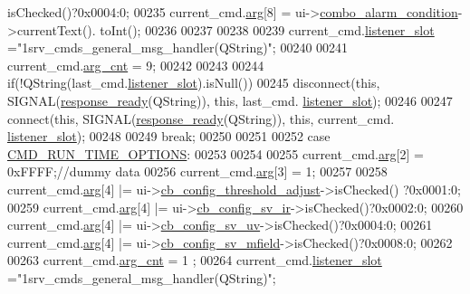 \begin{DoxyCode}
      isChecked()?0x0004:0;
00235             current\_cmd.\hyperlink{a00001_a56e6c2d7315d0ae60a51e8b140c9cfe4}{arg}[8]      = ui->\hyperlink{a00027_a2af463e4a88fddd219f2e41a386fbd68}{combo\_alarm\_condition}->currentText().
      toInt();
00236 
00237 
00238 
00239             current\_cmd.\hyperlink{a00001_abb76d8edb39876deb60975c8fd784b3f}{listener\_slot}   =\textcolor{stringliteral}{"1srv\_cmds\_general\_msg\_handler(QString)"};
00240 
00241             current\_cmd.\hyperlink{a00001_affcea772a1bc5362ebbc274b6166f81b}{arg\_cnt}     = 9;
00242 
00243 
00244             \textcolor{keywordflow}{if}(!QString(last\_cmd.\hyperlink{a00001_abb76d8edb39876deb60975c8fd784b3f}{listener\_slot}).isNull())
00245             disconnect(\textcolor{keyword}{this}, SIGNAL(\hyperlink{a00006_a3f6396874778799cf07a7a0149e54977}{response\_ready}(QString)), \textcolor{keyword}{this}, last\_cmd.
      \hyperlink{a00001_abb76d8edb39876deb60975c8fd784b3f}{listener\_slot});
00246 
00247             connect(\textcolor{keyword}{this}, SIGNAL(\hyperlink{a00006_a3f6396874778799cf07a7a0149e54977}{response\_ready}(QString)), \textcolor{keyword}{this}, current\_cmd.
      \hyperlink{a00001_abb76d8edb39876deb60975c8fd784b3f}{listener\_slot});
00248 
00249         \textcolor{keywordflow}{break};
00250 
00251 
00252     \textcolor{keywordflow}{case} \hyperlink{a00031_a1d8673a7ca545f3e382fc538f543ab72}{CMD\_RUN\_TIME\_OPTIONS}:
00253 
00254 
00255             current\_cmd.\hyperlink{a00001_a56e6c2d7315d0ae60a51e8b140c9cfe4}{arg}[2]   = 0xFFFF;\textcolor{comment}{//dummy data}
00256             current\_cmd.\hyperlink{a00001_a56e6c2d7315d0ae60a51e8b140c9cfe4}{arg}[3]   = 1;
00257 
00258             current\_cmd.\hyperlink{a00001_a56e6c2d7315d0ae60a51e8b140c9cfe4}{arg}[4]  |= ui->\hyperlink{a00027_a433ffc427e1103e6c2939f949ee5e5b5}{cb\_config\_threshold\_adjust}->isChecked()
      ?0x0001:0;
00259             current\_cmd.\hyperlink{a00001_a56e6c2d7315d0ae60a51e8b140c9cfe4}{arg}[4]  |= ui->\hyperlink{a00027_a4db3ccfbbf8c5222dd2f042d3073bbe8}{cb\_config\_sv\_ir}->isChecked()?0x0002:0;
00260             current\_cmd.\hyperlink{a00001_a56e6c2d7315d0ae60a51e8b140c9cfe4}{arg}[4]  |= ui->\hyperlink{a00027_a3a93cd0a3f3738aad252d063a8677839}{cb\_config\_sv\_uv}->isChecked()?0x0004:0;
00261             current\_cmd.\hyperlink{a00001_a56e6c2d7315d0ae60a51e8b140c9cfe4}{arg}[4]  |= ui->\hyperlink{a00027_a0a83284035ab2dbaeb39946522434986}{cb\_config\_sv\_mfield}->isChecked()?0x0008:0;
00262 
00263             current\_cmd.\hyperlink{a00001_affcea772a1bc5362ebbc274b6166f81b}{arg\_cnt}  = 1 ;
00264             current\_cmd.\hyperlink{a00001_abb76d8edb39876deb60975c8fd784b3f}{listener\_slot} =\textcolor{stringliteral}{"1srv\_cmds\_general\_msg\_handler(QString)"};

\end{DoxyCode}
